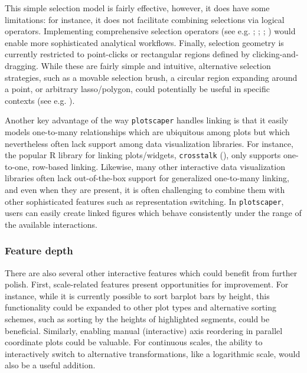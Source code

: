\documentclass[
  openany]{book}
\theoremstyle{definition}
\theoremstyle{definition}
\theoremstyle{definition}
\theoremstyle{definition}
\theoremstyle{remark}
\begin{document}
This simple selection model is fairly effective, however, it does have some limitations: for instance, it does not facilitate combining selections via logical operators. Implementing comprehensive selection operators (see e.g. ; ; ; ) would enable more sophisticated analytical workflows. Finally, selection geometry is currently restricted to point-clicks or rectangular regions defined by clicking-and-dragging. While these are fairly simple and intuitive, alternative selection strategies, such as a movable selection brush, a circular region expanding around a point, or arbitrary lasso/polygon, could potentially be useful in specific contexts (see e.g. ).

Another key advantage of the way \texttt{plotscaper} handles linking is that it easily models one-to-many relationships which are ubiquitous among plots but which nevertheless often lack support among data visualization libraries. For instance, the popular R library for linking plots/widgets, \texttt{crosstalk} (), only supports one-to-one, row-based linking. Likewise, many other interactive data visualization libraries often lack out-of-the-box support for generalized one-to-many linking, and even when they are present, it is often challenging to combine them with other sophisticated features such as representation switching. In \texttt{plotscaper}, users can easily create linked figures which behave consistently under the range of the available interactions.

\subsubsection{Feature depth}\label{feature-depth}

There are also several other interactive features which could benefit from further polish. First, scale-related features present opportunities for improvement. For instance, while it is currently possible to sort barplot bars by height, this functionality could be expanded to other plot types and alternative sorting schemes, such as sorting by the heights of highlighted segments, could be beneficial. Similarly, enabling manual (interactive) axis reordering in parallel coordinate plots could be valuable. For continuous scales, the ability to interactively switch to alternative transformations, like a logarithmic scale, would also be a useful addition.
\end{document}
